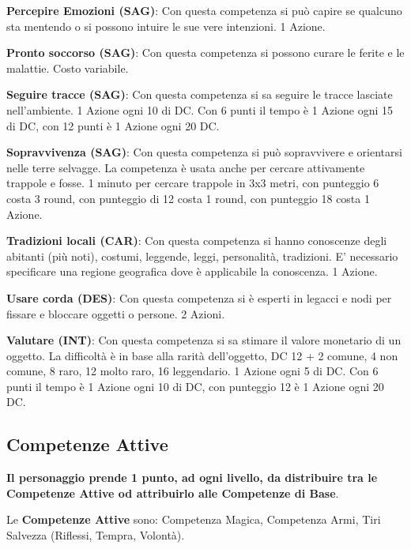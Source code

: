 \begin{multicols}{2}
\textbf{Percepire Emozioni (SAG)}: Con questa competenza si può capire se qualcuno sta mentendo o si possono intuire le sue vere intenzioni. 1 Azione.

\textbf{Pronto soccorso (SAG)}: Con questa competenza si possono curare le ferite e le malattie. Costo variabile.

\textbf{Seguire tracce (SAG)}: Con questa competenza si sa seguire le tracce lasciate nell'ambiente. 1 Azione ogni 10 di DC. Con 6 punti il tempo è 1 Azione ogni 15 di DC, con 12 punti è 1 Azione ogni 20 DC.

\textbf{Sopravvivenza (SAG)}: Con questa competenza si può sopravvivere e orientarsi nelle terre selvagge. La competenza è usata anche per cercare attivamente trappole e fosse. 1 minuto per cercare trappole in 3x3 metri, con punteggio 6 costa 3 round, con punteggio di 12 costa 1 round, con punteggio 18 costa 1 Azione.

\textbf{Tradizioni locali (CAR)}: Con questa competenza si hanno conoscenze degli abitanti (più noti), costumi, leggende, leggi, personalità, tradizioni. E' necessario specificare una regione geografica dove è applicabile la conoscenza. 1 Azione.

\textbf{Usare corda (DES)}: Con questa competenza si è esperti in legacci e nodi per fissare e bloccare oggetti o persone. 2 Azioni.

\textbf{Valutare (INT)}: Con questa competenza si sa stimare il valore monetario di un oggetto. La difficoltà è in base alla rarità dell'oggetto, DC 12 + 2 comune, 4 non comune, 8 raro, 12 molto raro, 16 leggendario. 1 Azione ogni 5 di DC. Con 6 punti il tempo è 1 Azione ogni 10 di DC, con punteggio 12 è 1 Azione ogni 20 DC. \label{valutare}

\medskip

\subsection{Competenze Attive}\label{competenzeattive}

\textbf{Il personaggio prende 1 punto, ad ogni livello, da distribuire tra le Competenze Attive od attribuirlo alle Competenze di Base}.

\medskip

Le \textbf{Competenze Attive} sono: Competenza Magica, Competenza Armi, Tiri Salvezza (Riflessi, Tempra, Volontà).

\noindent\begin{itemize}[leftmargin=*] \setlength{\itemsep}{0pt}


\end{itemize}
\end{multicols}
